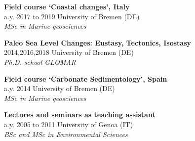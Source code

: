 \documentclass[%
               doublesided,
               paper=a4,
               fontsize=10pt
              ]{my-resume}
\begin{document}
{        \smallskip

    \small{\textbf{Field course ‘Coastal changes’, Italy}\\
    \faCalendar\hspace{0.5em}a.y. 2017 to 2019 \hspace{1em} \faUniversity\hspace{0.5em}University of Bremen (DE)\\
    \faMortarBoard\hspace{0.5em}\textit{MSc in Marine geosciences}}
   
        \smallskip

    \small{\textbf{Paleo Sea Level Changes: Eustasy, Tectonics, Isostasy}\\
    \faCalendar\hspace{0.5em}2014,2016,2018 \hspace{1em} \faUniversity\hspace{0.5em}University of Bremen (DE)\\
    \faMortarBoard\hspace{0.5em}\textit{Ph.D. school GLOMAR}}
 
        \smallskip

    \small{\textbf{Field course ‘Carbonate Sedimentology’, Spain}\\
    \faCalendar\hspace{0.5em}a.y. 2014 \hspace{1em} \faUniversity\hspace{0.5em}University of Bremen (DE)\\
    \faMortarBoard\hspace{0.5em}\textit{MSc in Marine geosciences}}    

    \small{\textbf{Lectures and seminars as teaching assistant}\\
    \faCalendar\hspace{0.5em}a.y. 2005 to 2011 \hspace{1em} \faUniversity\hspace{0.5em}University of Genoa (IT)\\
    \faMortarBoard\hspace{0.5em}\textit{BSc and MSc in Environmental Sciences}}    
    
}      
\makebody

                  
\clearpage


\pagestyle{highlightmain}

\end{document}
